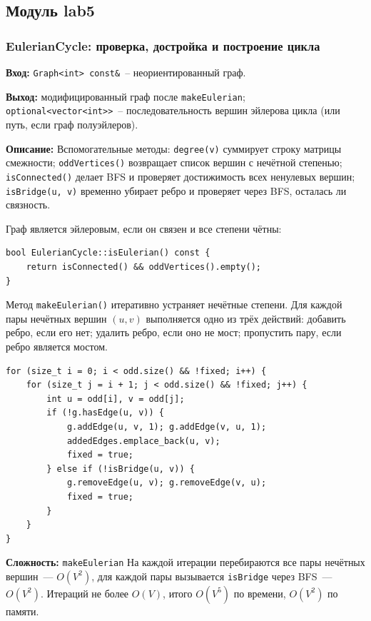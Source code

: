 \subsection{Модуль lab5}

\subsubsection{EulerianCycle: проверка, достройка и построение цикла}

\textbf{Вход:} \texttt{Graph<int> const\&}~-- неориентированный граф.

\textbf{Выход:} модифицированный граф после \texttt{makeEulerian};
\texttt{optional<vector<int>>}~-- последовательность вершин эйлерова
цикла (или путь, если граф полуэйлеров).

\textbf{Описание:} Вспомогательные методы: \texttt{degree(v)} суммирует
строку матрицы смежности; \texttt{oddVertices()} возвращает список
вершин с нечётной степенью; \texttt{isConnected()} делает BFS и проверяет
достижимость всех ненулевых вершин; \texttt{isBridge(u, v)} временно
убирает ребро и проверяет через BFS, осталась ли связность.

Граф является эйлеровым, если он связен и все степени чётны:

\begin{lstlisting}[style=cstyle, caption={Проверка эйлеровости (euler.cpp)}]
bool EulerianCycle::isEulerian() const {
    return isConnected() && oddVertices().empty();
}
\end{lstlisting}

Метод \texttt{makeEulerian()} итеративно устраняет нечётные степени.
Для каждой пары нечётных вершин $(u, v)$ выполняется одно из трёх
действий: добавить ребро, если его нет; удалить ребро, если оно не мост;
пропустить пару, если ребро является мостом.

\begin{lstlisting}[style=cstyle, caption={Достройка до эйлерового графа (euler.cpp)}]
for (size_t i = 0; i < odd.size() && !fixed; i++) {
    for (size_t j = i + 1; j < odd.size() && !fixed; j++) {
        int u = odd[i], v = odd[j];
        if (!g.hasEdge(u, v)) {
            g.addEdge(u, v, 1); g.addEdge(v, u, 1);
            addedEdges.emplace_back(u, v);
            fixed = true;
        } else if (!isBridge(u, v)) {
            g.removeEdge(u, v); g.removeEdge(v, u);
            fixed = true;
        }
    }
}
\end{lstlisting}

\textbf{Сложность:}
\texttt{makeEulerian}
На каждой итерации перебираются все пары нечётных вершин~--- $O(V^2)$,
для каждой пары вызывается \texttt{isBridge} через BFS~--- $O(V^2)$.
Итераций не более $O(V)$, итого $O(V^5)$ по времени, $O(V^2)$ по памяти.

